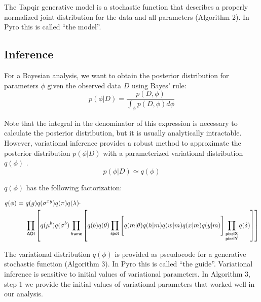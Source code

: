The Tapqir generative model is a stochastic function that describes a properly normalized joint distribution for the data and all parameters (Algorithm 2). In Pyro this is called ``the model''.
 


\subsection*{Inference}

For a Bayesian analysis, we want to obtain the posterior distribution for parameters $\phi$ given the observed data $D$ using Bayes' rule:
%
\begin{equation}
    p(\phi | D) =
    \dfrac{p(D, \phi)}{\int_{\phi} p(D, \phi) d\phi}
\end{equation}

Note that the integral in the denominator of this expression is necessary to calculate the posterior distribution, but it is usually analytically intractable. However, variational inference provides a robust method to approximate the posterior distribution $p(\phi | D)$ with a parameterized variational distribution $q(\phi)$ \cite{Bishop2006-oa}.
%
\begin{equation}
    p(\phi | D) \simeq q(\phi)
\end{equation}


$q(\phi)$ has the following factorization:

\begin{equation}
\begin{aligned}
    q(\phi) =~&q(g) q(\sigma^{xy}) q(\pi) q(\lambda) \cdot \\
    &\prod_{\mathsf{AOI}} \left[ q(\mu^b) q(\sigma^b) \prod_{\mathsf{frame}} \left[ q(b) q(\theta) \prod_{\mathsf{spot}} \left[ \vphantom{\prod_{F}} q(m | \theta) q(h | m) q(w | m) q(x | m) q(y | m) \right] \prod_{\substack{\mathsf{pixelX} \\ \mathsf{pixelY}}} q(\delta) \right] \right]
\end{aligned}
\end{equation}

The variational distribution $q(\phi)$ is provided as pseudocode for a generative stochastic function (Algorithm 3). In Pyro this is called ``the guide''. Variational inference is sensitive to initial values of variational parameters. In Algorithm 3, step 1 we provide the initial values of variational parameters that worked well in our analysis.



